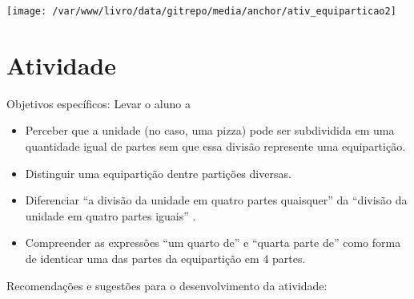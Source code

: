 \documentclass[a4paper,12pt,twoside]{book}
\begin{document}
\texttt{[image: /var/www/livro/data/gitrepo/media/anchor/ativ\_equiparticao2]}
\section{Atividade}




\begin{professor*}[breakable]{}{}  
  
  Objetivos específicos: Levar o aluno a  
  
\begin{itemize} %
    \item       Perceber que a unidade (no caso, uma pizza) pode ser subdividida em uma quantidade igual de partes sem que essa divisão represente uma equipartição.
    \item       Distinguir uma equipartição dentre partições diversas.
    \item       Diferenciar       ``a divisão da unidade em quatro partes quaisquer''       da       ``divisão da unidade em quatro partes iguais''      . 
    \item       Compreender as expressões       ``um quarto de''       e       ``quarta parte de''       como forma de identicar uma das partes da equipartição em 4 partes. 
\end{itemize} %
  
  
  Recomendações e sugestões para o desenvolvimento da atividade:  
     

\end{professor*}
\end{document}

